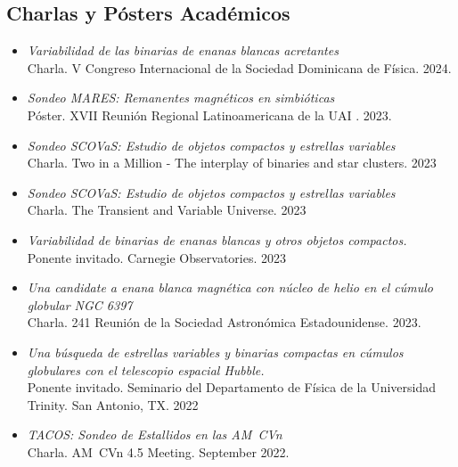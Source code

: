 \documentclass[letterpaper,10pt]{article}
\begin{document}
\subsection*{Charlas y P\'osters Acad\'emicos}

\begin{itemize}[label=$\blacktriangleright$]

\item \textit{Variabilidad de las binarias de enanas blancas acretantes} \\ Charla. V Congreso Internacional de la Sociedad Dominicana de F\'isica. 2024.


\item \textit{Sondeo MARES: Remanentes magn\'eticos en simbi\'oticas} \\ P\'oster. XVII Reuni\'on Regional Latinoamericana de la UAI . 2023.

\item \textit{ Sondeo SCOVaS: Estudio de objetos compactos y estrellas variables}  \\ Charla. Two in a Million - The interplay of binaries and star clusters. 2023


\item \textit{ Sondeo SCOVaS: Estudio de objetos compactos y estrellas variables}  \\ Charla. The Transient and Variable Universe. 2023


\item \textit{ Variabilidad de binarias de enanas blancas y otros objetos compactos.} \\ Ponente invitado. Carnegie Observatories. 2023

\item \textit{Una candidate a enana blanca magn\'etica con n\'ucleo de helio en el c\'umulo globular NGC 6397} \\ Charla. 241 Reuni\'on de la Sociedad Astron\'omica Estadounidense. 2023.

\item \emph{Una b\'usqueda de estrellas variables y binarias compactas en c\'umulos globulares con el telescopio espacial Hubble.} \\ Ponente invitado. Seminario del Departamento de F\'isica de la Universidad Trinity. San Antonio, TX. 2022

\item \textit{TACOS: Sondeo de Estallidos en las AM~CVn} \\ Charla. AM~CVn 4.5 Meeting. September 2022.


\end{itemize}
\end{document}
